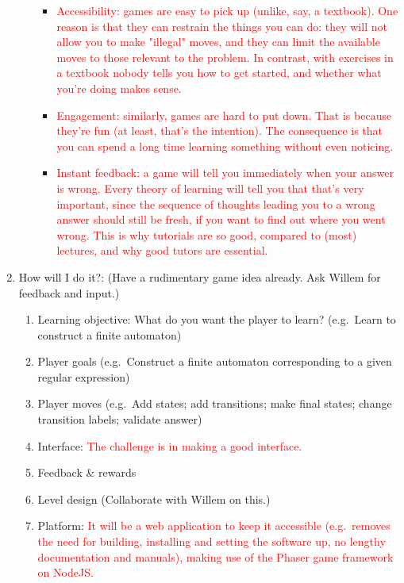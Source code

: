 \documentclass[a4paper,11pt]{article}
\newcommand{\draft}[1]{\textcolor{red}{#1}} %
\begin{document}
\begin{enumerate}
\begin{itemize}
\begin{itemize}
        \item \draft{Accessibility: games are easy to pick up (unlike, say, a textbook). One reason is that they can restrain the things you can do: they will not allow you to make "illegal" moves, and they can limit the available moves to those relevant to the problem. In contrast, with exercises in a textbook nobody tells you how to get started, and whether what you're doing makes sense.}
        \item \draft{Engagement: similarly, games are hard to put down. That is because they're fun (at least, that's the intention). The consequence is that you can spend a long time learning something without even noticing.}
        \item \draft{Instant feedback: a game will tell you immediately when your answer is wrong. Every theory of learning will tell you that that's very important, since the sequence of thoughts leading you to a wrong answer should still be fresh, if you want to find out where you went wrong. This is why tutorials are so good, compared to (most) lectures, and why good tutors are essential.}
      \end{itemize}
    \end{itemize}
  \item How will I do it?: (Have a rudimentary game idea already. Ask Willem for feedback and input.)
    \begin{enumerate}
      \item Learning objective: What do you want the player to learn? (e.g.\ Learn to construct a finite automaton)
      \item Player goals (e.g.\ Construct a finite automaton corresponding to a given regular expression)
      \item Player moves (e.g.\ Add states; add transitions; make final states; change transition labels; validate answer)
      \item Interface: \draft{The challenge is in making a good interface.}
      \item Feedback \& rewards
      \item Level design (Collaborate with Willem on this.)
      \item Platform: \draft{It will be a web application to keep it accessible (e.g.\ removes the need for building, installing and setting the software up, no lengthy documentation and manuals), making use of the Phaser game framework on NodeJS.}
    \end{enumerate}
\end{enumerate}
\end{document}
